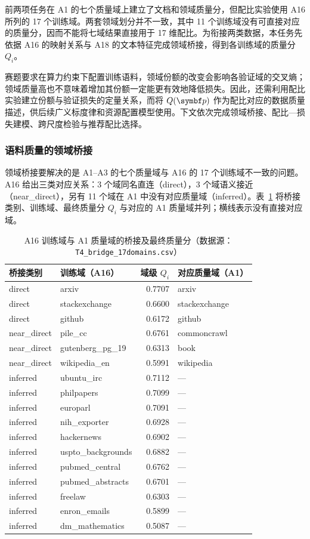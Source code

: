 前两项任务在 A1 的七个质量域上建立了文档和领域质量分，但配比实验使用 A16 所列的 17 个训练域。两套领域划分并不一致，其中 11 个训练域没有可直接对应的质量分，因而不能将七域结果直接用于 17 维配比。为衔接两类数据，本任务先依据 A16 的映射关系与 A18 的文本特征完成领域桥接，得到各训练域的质量分 $Q_i$。

赛题要求在算力约束下配置训练语料，领域份额的改变会影响各验证域的交叉熵；领域质量高也不意味着增加其份额一定能更有效地降低损失。因此，还需利用配比实验建立份额与验证损失的定量关系，而将 $Q(\bp)$ 作为配比对应的数据质量描述，供后续广义标度律和资源配置模型使用。下文依次完成领域桥接、配比—损失建模、跨尺度检验与推荐配比选择。

\subsubsection{语料质量的领域桥接}
\label{sec:q1_bridge}

领域桥接要解决的是 A1–A3 的七个质量域与 A16 的 17 个训练域不一致的问题。A16 给出三类对应关系：3 个域同名直连（direct），3 个域语义接近（near\_direct），另有 11 个域在 A1 中没有对应质量域（inferred）。表~\ref{tab:q1_bridge_map} 将桥接类别、训练域、最终质量分 $Q_i$ 与对应的 A1 质量域并列；横线表示没有直接对应域。

\begin{table}[H]
\centering\footnotesize
\caption{A16 训练域与 A1 质量域的桥接及最终质量分（数据源：\texttt{T4\_bridge\_17domains.csv}）}
\label{tab:q1_bridge_map}
\begin{tabularx}{\textwidth}{@{}p{2.25cm} X r p{2.8cm}@{}}
\toprule
桥接类别 & 训练域（A16） & 域级 $Q_i$ & 对应质量域（A1） \\
\midrule
direct & arxiv & 0.7707 & arxiv \\
direct & stackexchange & 0.6600 & stackexchange \\
direct & github & 0.6172 & github \\
\addlinespace
near\_direct & pile\_cc & 0.6761 & commoncrawl \\
near\_direct & gutenberg\_pg\_19 & 0.6313 & book \\
near\_direct & wikipedia\_en & 0.5991 & wikipedia \\
\addlinespace
inferred & ubuntu\_irc & 0.7112 & --- \\
inferred & philpapers & 0.7099 & --- \\
inferred & europarl & 0.7091 & --- \\
inferred & nih\_exporter & 0.6928 & --- \\
inferred & hackernews & 0.6902 & --- \\
inferred & uspto\_backgrounds & 0.6882 & --- \\
inferred & pubmed\_central & 0.6762 & --- \\
inferred & pubmed\_abstracts & 0.6701 & --- \\
inferred & freelaw & 0.6303 & --- \\
inferred & enron\_emails & 0.5899 & --- \\
inferred & dm\_mathematics & 0.5087 & --- \\
\bottomrule
\end{tabularx}
\end{table}

